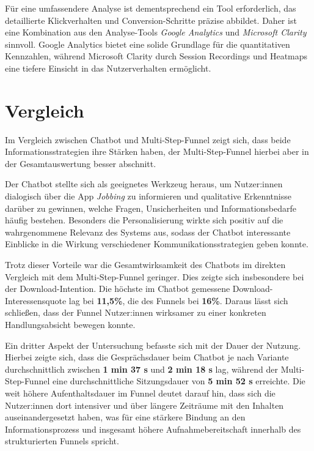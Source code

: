 Für eine umfassendere Analyse ist dementsprechend ein Tool erforderlich, 
das detaillierte Klickverhalten und 
Conversion-Schritte präzise abbildet.
Daher ist eine Kombination aus den Analyse-Tools
\textit{Google Analytics} und \textit{Microsoft Clarity} sinnvoll. 
Google Analytics bietet eine solide Grundlage für die quantitativen Kennzahlen, 
während Microsoft Clarity durch Session Recordings und Heatmaps eine 
tiefere Einsicht in das Nutzerverhalten ermöglicht.

\setauthor{\firstauthor}
\section{Vergleich}

Im Vergleich zwischen Chatbot und Multi-Step-Funnel zeigt sich, dass beide
Informationsstrategien ihre Stärken haben, der Multi-Step-Funnel hierbei
aber in der Gesamtauswertung besser abschnitt.

Der Chatbot stellte sich als geeignetes Werkzeug heraus, um Nutzer:innen
dialogisch über die App \textit{Jobbing} zu informieren und qualitative
Erkenntnisse darüber zu gewinnen, welche Fragen, Unsicherheiten und
Informationsbedarfe häufig bestehen. Besonders die Personalisierung
wirkte sich positiv auf die wahrgenommene Relevanz des Systems aus, sodass
der Chatbot interessante Einblicke in die Wirkung verschiedener
Kommunikationsstrategien geben konnte.

Trotz dieser Vorteile war die Gesamtwirksamkeit des Chatbots im 
direkten Vergleich mit dem Multi-Step-Funnel geringer. Dies zeigte sich 
insbesondere bei der Download-Intention. Die höchste im Chatbot gemessene 
Download-Interessensquote lag bei \textbf{11,5\%}, die des Funnels bei \textbf{16\%}. 
Daraus lässt sich schließen, dass der Funnel Nutzer:innen wirksamer zu einer 
konkreten Handlungsabsicht bewegen konnte.

Ein dritter Aspekt der Untersuchung befasste sich mit der Dauer der Nutzung. 
Hierbei zeigte sich, dass die Gesprächsdauer beim Chatbot je nach Variante 
durchschnittlich zwischen \textbf{1 min 37 s} und \textbf{2 min 18 s} lag, während der 
Multi-Step-Funnel eine durchschnittliche Sitzungsdauer von \textbf{5 min 52 s} erreichte. 
Die weit höhere Aufenthaltsdauer im Funnel deutet darauf hin, dass sich die 
Nutzer:innen dort intensiver und über längere Zeiträume mit den Inhalten 
auseinandergesetzt haben, was für eine stärkere Bindung an den 
Informationsprozess und insgesamt höhere Aufnahmebereitschaft innerhalb des 
strukturierten Funnels spricht.


